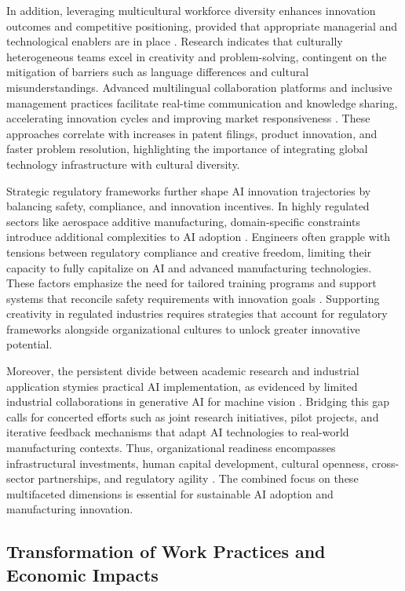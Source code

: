 \documentclass[sigconf]{acmart}
\begin{document}
In addition, leveraging multicultural workforce diversity enhances innovation outcomes and competitive positioning, provided that appropriate managerial and technological enablers are in place \cite{ref16}. Research indicates that culturally heterogeneous teams excel in creativity and problem-solving, contingent on the mitigation of barriers such as language differences and cultural misunderstandings. Advanced multilingual collaboration platforms and inclusive management practices facilitate real-time communication and knowledge sharing, accelerating innovation cycles and improving market responsiveness \cite{ref17,ref19}. These approaches correlate with increases in patent filings, product innovation, and faster problem resolution, highlighting the importance of integrating global technology infrastructure with cultural diversity.

Strategic regulatory frameworks further shape AI innovation trajectories by balancing safety, compliance, and innovation incentives. In highly regulated sectors like aerospace additive manufacturing, domain-specific constraints introduce additional complexities to AI adoption \cite{ref16}. Engineers often grapple with tensions between regulatory compliance and creative freedom, limiting their capacity to fully capitalize on AI and advanced manufacturing technologies. These factors emphasize the need for tailored training programs and support systems that reconcile safety requirements with innovation goals \cite{ref9}. Supporting creativity in regulated industries requires strategies that account for regulatory frameworks alongside organizational cultures to unlock greater innovative potential.

Moreover, the persistent divide between academic research and industrial application stymies practical AI implementation, as evidenced by limited industrial collaborations in generative AI for machine vision \cite{ref3}. Bridging this gap calls for concerted efforts such as joint research initiatives, pilot projects, and iterative feedback mechanisms that adapt AI technologies to real-world manufacturing contexts. Thus, organizational readiness encompasses infrastructural investments, human capital development, cultural openness, cross-sector partnerships, and regulatory agility \cite{ref36}. The combined focus on these multifaceted dimensions is essential for sustainable AI adoption and manufacturing innovation.

\subsection{Transformation of Work Practices and Economic Impacts}
\end{document}
